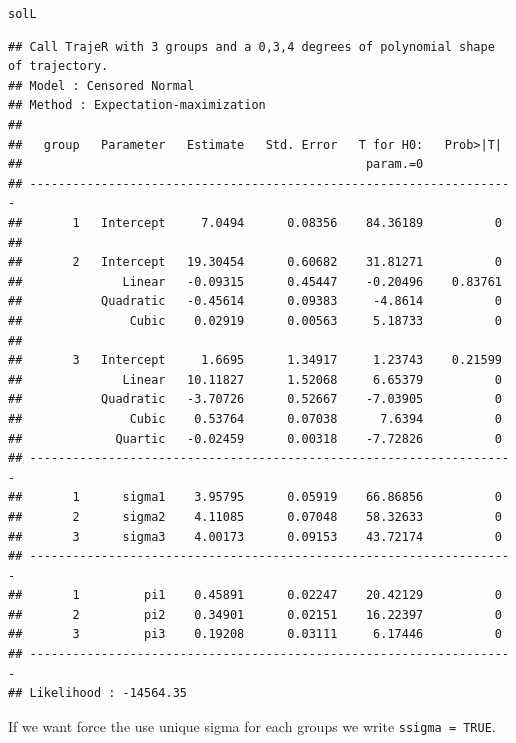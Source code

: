 \documentclass{article}\usepackage[]{graphicx}\usepackage[]{color}
\makeatletter
\newcommand{\hlstd}[1]{\textcolor[rgb]{0.345,0.345,0.345}{#1}}%
\newenvironment{kframe}{%
 \def\at@end@of@kframe{}%
 \ifinner\ifhmode%
  \def\at@end@of@kframe{\end{minipage}}%
  \begin{minipage}{\columnwidth}%
 \fi\fi%
 \def\FrameCommand##1{\hskip\@totalleftmargin \hskip-\fboxsep
 \colorbox{shadecolor}{##1}\hskip-\fboxsep
     \hskip-\linewidth \hskip-\@totalleftmargin \hskip\columnwidth}%
 \MakeFramed {\advance\hsize-\width
   \@totalleftmargin\z@ \linewidth\hsize
   \@setminipage}}%
 {\par\unskip\endMakeFramed%
 \at@end@of@kframe}
\newenvironment{knitrout}{}{} %
\makeatother
\begin{document}
\begin{knitrout}
\color{fgcolor}\begin{kframe}
\begin{alltt}
\hlstd{solL}
\end{alltt}
\begin{verbatim}
## Call TrajeR with 3 groups and a 0,3,4 degrees of polynomial shape of trajectory.
## Model : Censored Normal
## Method : Expectation-maximization 
##  
##   group   Parameter   Estimate   Std. Error   T for H0:   Prob>|T|  
##                                                param.=0             
## --------------------------------------------------------------------
##       1   Intercept     7.0494      0.08356    84.36189          0  
##                                                                     
##       2   Intercept   19.30454      0.60682    31.81271          0  
##              Linear   -0.09315      0.45447    -0.20496    0.83761  
##           Quadratic   -0.45614      0.09383     -4.8614          0  
##               Cubic    0.02919      0.00563     5.18733          0  
##                                                                     
##       3   Intercept     1.6695      1.34917     1.23743    0.21599  
##              Linear   10.11827      1.52068     6.65379          0  
##           Quadratic   -3.70726      0.52667    -7.03905          0  
##               Cubic    0.53764      0.07038      7.6394          0  
##             Quartic   -0.02459      0.00318    -7.72826          0  
## --------------------------------------------------------------------
##       1      sigma1    3.95795      0.05919    66.86856          0  
##       2      sigma2    4.11085      0.07048    58.32633          0  
##       3      sigma3    4.00173      0.09153    43.72174          0  
## --------------------------------------------------------------------
##       1         pi1    0.45891      0.02247    20.42129          0  
##       2         pi2    0.34901      0.02151    16.22397          0  
##       3         pi3    0.19208      0.03111     6.17446          0  
## --------------------------------------------------------------------
## Likelihood : -14564.35
\end{verbatim}
\end{kframe}
\end{knitrout}
If we want force the use unique sigma for each groups we write \verb|ssigma = TRUE|.
\end{document}

